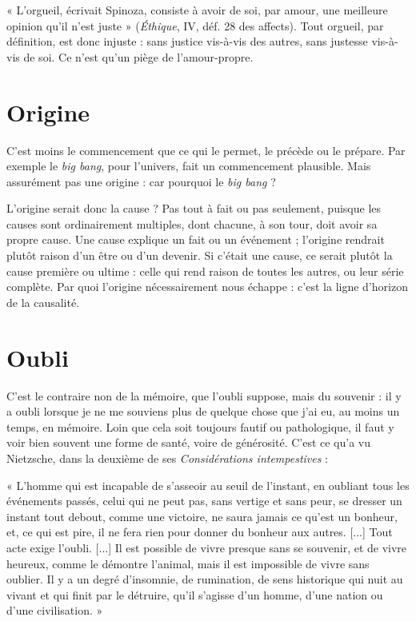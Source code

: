 « L’orgueil, écrivait Spinoza, consiste à avoir de soi, par amour, une
meilleure opinion qu’il n’est juste » ({\it Éthique}, IV, déf. 28 des affects). Tout
orgueil, par définition, est donc injuste : sans justice vis-à-vis des autres, sans
justesse vis-à-vis de soi. Ce n’est qu’un piège de l’amour-propre.

\section{Origine}
C’est moins le commencement que ce qui le permet, le précède
ou le prépare. Par exemple le {\it big bang}, pour l’univers, fait un
commencement plausible. Mais assurément pas une origine : car pourquoi le
{\it big bang} ?

L'origine serait donc la cause ? Pas tout à fait ou pas seulement, puisque les
causes sont ordinairement multiples, dont chacune, à son tour, doit avoir sa
propre cause. Une cause explique un fait ou un événement ; l’origine rendrait
plutôt raison d’un être ou d’un devenir. Si c'était une cause, ce serait plutôt la
cause première ou ultime : celle qui rend raison de toutes les autres, ou leur
série complète. Par quoi l’origine nécessairement nous échappe : c’est la ligne
d’horizon de la causalité.

\section{Oubli}
C’est le contraire non de la mémoire, que l'oubli suppose, mais du
souvenir : il y a oubli lorsque je ne me souviens plus de quelque
chose que j'ai eu, au moins un temps, en mémoire. Loin que cela soit toujours
fautif ou pathologique, il faut y voir bien souvent une forme de santé, voire de
générosité. C’est ce qu’a vu Nietzsche, dans la deuxième de ses {\it Considérations
intempestives} :

\vspace{0.5cm}

{\footnotesize 

« L'homme qui est incapable de s'asseoir au seuil de l'instant, en oubliant tous les
événements passés, celui qui ne peut pas, sans vertige et sans peur, se dresser un instant
tout debout, comme une victoire, ne saura jamais ce qu'est un bonheur, et, ce qui est
pire, il ne fera rien pour donner du bonheur aux autres. [...] Tout acte exige l’oubli.
[...] Il est possible de vivre presque sans se souvenir, et de vivre heureux, comme le
démontre l’animal, mais il est impossible de vivre sans oublier. Il y a un degré
d’insomnie, de rumination, de sens historique qui nuit au vivant et qui finit par le
détruire, qu’il s'agisse d’un homme, d’une nation ou d’une civilisation. »

}

